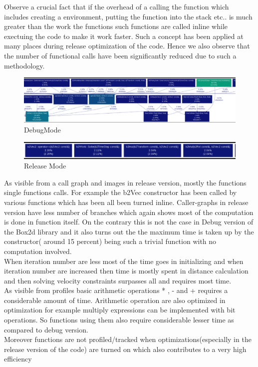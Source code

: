 \documentclass[a4paper,11pt]{article}
\begin{document}
\begin{itemize}
Observe a crucial fact that if the overhead of a calling the function which includes creating a environment, putting the function into the stack etc.. is much greater than the work the functions such functions are called inline while exectuing the code to make it work faster. Such a concept has been applied at many places during release optimization of the code. 
Hence we also observe that the number of functional calls have been significantly reduced due to such a methodology.\\
\begin{figure}[ht]
	\includegraphics[width=180mm]{3.eps}
	\caption{DebugMode}			
\end{figure}
\begin{figure}[ht]
	\includegraphics[width=180mm]{4.eps}
	\caption{Release Mode}			
\end{figure}
As visible from a call graph and images in release version, mostly the functions single functions calls.
For example  the b2Vec constructor has been called by various functions which has been  all been turned inline.
Caller-graphs in release version have less number of branches which again shows most of the computation is done in function itself. On the contrary this is not the case in Debug version of the Box2d library and it also turns out the the maximum time is taken up by the constructor( around 15 percent) being such a trivial function with no computation involved.\\
When iteration number are less most of the time goes in initializing and when iteration number are increased then time is mostly spent in distance calculation and then solving velocity constraints surpasses all and requires most time.\\

As visible from profiles basic arithmetic operations * , - and + requires a considerable amount of time. Arithmetic operation are also optimized in optimization for example multiply expressions can be implemented with bit operations. So functions using them also require considerable lesser time as compared to debug version.
\\
Moreover functions are not profiled/tracked when optimizations(especially in the release version of the code) are turned on which also contributes to a very high efficiency
\\

\end{itemize}
\end{document}
